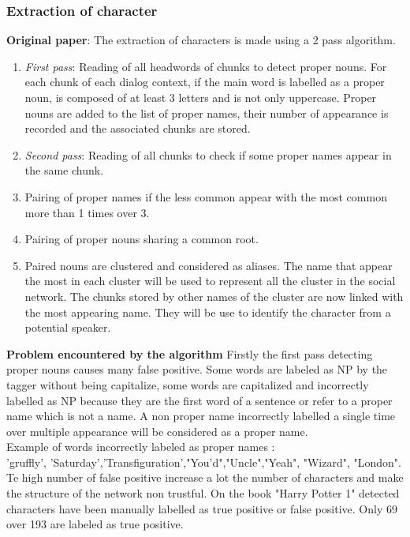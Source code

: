 \documentclass[a4paper, 12pt]{report}
\begin{document}
\subsubsection{Extraction of character}
\textbf{Original paper}:
The extraction of characters is made using a 2 pass algorithm.
\begin{enumerate}
    \item \textit{First pass}: Reading of all headwords of chunks to detect proper nouns. For each chunk of each dialog context, if the main word is labelled as a proper noun, is composed of at least 3 letters and is not only uppercase. Proper nouns are added to the list of proper names, their number of appearance is recorded and the associated chunks are stored.\\
    \item \textit{Second pass}: Reading of all chunks to check if some proper names appear in the same chunk.
    \item Pairing of proper names if the less common appear with the most common more than 1 times over 3.
    \item Pairing of proper nouns sharing a common root.
    \item Paired nouns are clustered and considered as aliases. The name that appear the most in each cluster will be used to represent all the cluster in the social network. The chunks stored by other names of the cluster are now linked with the most appearing name. They will be use to identify the character from a potential speaker.
\end{enumerate}{}

\textbf{Problem encountered by the algorithm}
Firstly the first pass detecting proper nouns causes many false positive. Some words are labeled as NP by the tagger without being capitalize, some words are capitalized and incorrectly labelled as NP because they are the first word of a sentence or refer to a  proper name which is not a name. A non proper name incorrectly labelled a single time over multiple appearance will be considered as a proper name.\\
Example of words incorrectly labeled as proper names :\\
'gruffly', 'Saturday','Transfiguration',"You'd","Uncle","Yeah", "Wizard", "London". 
Te high number of false positive increase a lot the number of characters and make the structure of the network non trustful.
On the book "Harry Potter 1" detected characters have been manually labelled as true positive or false positive. Only 69 over 193 are labeled as true positive.\\
\end{document}
